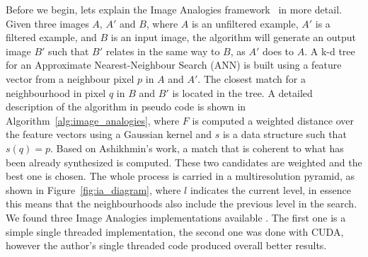 \documentclass[11pt]{report}
\begin{document}
Before we begin, lets explain the Image Analogies framework~\cite{Hertzmann2001} in more detail.
Given three images $A$, $A'$ and $B$, where $A$ is an unfiltered example, $A'$ is a filtered example, and $B$ is an input image, the algorithm will generate an output image $B'$ such that $B'$ relates in the same way to $B$, as $A'$ does to $A$.
A k-d tree for an Approximate Nearest-Neighbour Search (ANN) is built using a feature vector from a neighbour pixel $p$ in $A$ and $A'$.
The closest match for a neighbourhood in pixel $q$ in $B$ and $B'$ is located in the tree.
A detailed description of the algorithm in pseudo code is shown in Algorithm~\ref{alg:image_analogies}, where $F$ is computed a weighted distance over the feature vectors using a Gaussian kernel and $s$ is a data structure such that $s(q) = p$.
Based on Ashikhmin's work, a match that is coherent to what has been already synthesized is computed.
These two candidates are weighted and the best one is chosen.
The whole process is carried in a multiresolution pyramid, as shown in Figure~\ref{fig:ia_diagram}, where $l$ indicates the current level, in essence this means that the neighbourhoods also include the previous level in the search.
We found three Image Analogies implementations available \cite{ImAnSingleThreadWeb, ImAnCudaWeb, ImAnHertzmannWeb}.
The first one is a simple single threaded implementation, the second one was done with CUDA, however the author's single threaded code produced overall better results.
\end{document}
